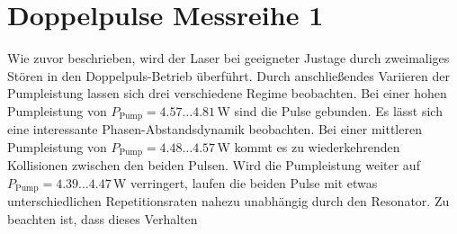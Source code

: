 \documentclass[bachelor,       %
               twoside,        %
               BCOR10mm,       %
               liststotoc,nomtotoc,bibtotoc, %
               english,ngerman, %
               final,          %
               ]{GAUBM}
\begin{document}
\section{Doppelpulse Messreihe 1}
Wie zuvor beschrieben, wird der Laser bei geeigneter Justage durch zweimaliges Stören in den Doppelpuls-Betrieb überführt.
Durch anschließendes Variieren der Pumpleistung lassen sich drei verschiedene Regime beobachten.
Bei einer hohen Pumpleistung von $P_\text{Pump}=4.57\dots 4.81\,$W sind die Pulse gebunden.
Es lässt sich eine interessante Phasen-Abstandsdynamik beobachten.
Bei einer mittleren Pumpleistung von $P_\text{Pump}=4.48\dots 4.57\,$W kommt es zu wiederkehrenden Kollisionen zwischen den beiden Pulsen.
Wird die Pumpleistung weiter auf $P_\text{Pump}=4.39\dots 4.47\,$W verringert, laufen die beiden Pulse mit etwas unterschiedlichen Repetitionsraten nahezu unabhängig durch den Resonator.
Zu beachten ist, dass dieses Verhalten 
\end{document}
